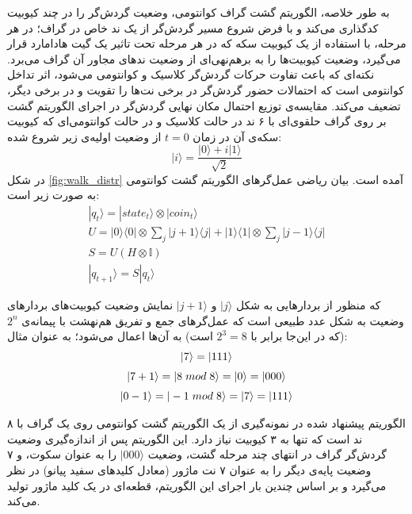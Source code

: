 به طور خلاصه، الگوریتم گشت گراف کوانتومی، وضعیت گردش‌گر را در چند کیوبیت کدگذاری می‌کند و با فرض شروع مسیر گردش‌گر از یک ند خاص در گراف؛ در هر مرحله، با استفاده از یک کیوبیت سکه
که در هر مرحله تحت تاثیر یک گیت هادامارد قرار می‌گیرد، وضعیت کیوبیت‌ها را به برهم‌نهی‌ای از وضعیت ندهای مجاور آن گراف می‌برد. نکته‌ای که باعث تفاوت حرکات گردش‌گر کلاسیک و کوانتومی می‌شود، اثر تداخل کوانتومی
است که احتمالات حضور گردش‌گر در برخی نت‌ها را تقویت و در برخی دیگر، تضعیف می‌کند.
مقایسه‌ی توزیع احتمال مکان نهایی گردش‌گر در اجرای الگوریتم گشت بر روی گراف حلقوی‌ای با ۶ ند در حالت کلاسیک و در حالت کوانتومی‌ای که کیوبیت سکه‌ی آن در زمان
$t=0$
از وضعیت اولیه‌ی زیر شروع شده:
\begin{equation}
    |i\rangle = \frac{|0\rangle + i|1\rangle}{\sqrt{2}}
\end{equation}
در شکل
\ref{fig:walk_distr}
آمده است.
بیان ریاضی عمل‌گرهای الگوریتم گشت کوانتومی به صورت زیر است:
\begin{equation}
\begin{gathered}
    |q_t\rangle = |state_t\rangle \otimes |coin_t\rangle \\[3pt]
    U = |0\rangle \langle 0| \otimes \sum_j |j + 1\rangle \langle j| + |1\rangle \langle 1| \otimes \sum_j |j - 1\rangle
    \langle j| \\[3pt]
    S = U(H \otimes \mathbb{I}) \\[3pt]
    |q_{t+1}\rangle = S|q_t \rangle
\end{gathered}
\end{equation}

که منظور از بردارهایی به شکل
$|j\rangle$
و 
$|j+1\rangle$
نمایش وضعیت کیوبیت‌های بردارهای وضعیت به شکل عدد طبیعی است که عمل‌گرهای جمع و تفریق هم‌نهشت
با پیمانه‌ی
$2^n$
(که در این‌جا برابر با 
$2^3 = 8$
است)
به آن‌ها اعمال می‌شود؛ به عنوان مثال:
\begin{equation}
    \begin{gathered}
        |7\rangle = |111\rangle \\[3pt]
        |7 + 1\rangle = |8 \hspace{1mm} mod \hspace{1mm} 8\rangle = |0\rangle = |000\rangle \\[3pt]
        |0 - 1\rangle = |-1 \hspace{1mm} mod \hspace{1mm} 8\rangle = |7\rangle = |111\rangle
    \end{gathered}
\end{equation}

الگوریتم پیشنهاد شده در 
\cite{miranda}
نمونه‌گیری از یک الگوریتم گشت کوانتومی روی یک گراف با ۸ ند است که تنها به ۳ کیوبیت نیاز دارد. این الگوریتم پس از اندازه‌گیری وضعیت گردش‌گر گراف در انتهای چند مرحله گشت، وضعیت
$|000\rangle$
را به عنوان سکوت، و ۷ وضعیت پایه‌ی دیگر را به عنوان ۷ نت ماژور (معادل کلیدهای سفید پیانو) در نظر می‌گیرد و بر اساس چندین بار اجرای این الگوریتم، قطعه‌ای در یک کلید ماژور تولید می‌کند.